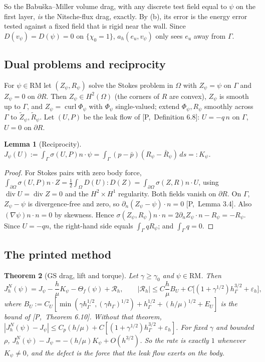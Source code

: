 \documentclass[11pt,reqno]{amsart}
\theoremstyle{plain}
\newtheorem{theorem}{Theorem}[section]
\newtheorem{lemma}[theorem]{Lemma}
\theoremstyle{definition}
\newcommand{\hG}{h_\Gamma}
\newcommand{\dn}{\partial_n}
\newcommand{\pbar}{\bar p}
\newcommand{\GS}{\mathrm{GS}}
\newcommand{\eps}{\varepsilon_h}
\newcommand{\curl}{\operatorname{curl}}
\renewcommand{\div}{\operatorname{div}}
\newcommand{\Pref}[1]{\textup{[P,~#1]}}
\newcommand{\RM}{\mathrm{RM}}
\begin{document}
So the Babu\v{s}ka--Miller volume drag, with any discrete test field equal to $\psi$ on the first layer, \emph{is} the Nitsche-flux drag, exactly. By (b), its error is the energy error tested against a fixed field that is rigid near the wall. Since $D(v_\psi)=D(\psi)=0$ on $\{\chi_0=1\}$, $a_h(e_u,v_\psi)$ only sees $e_u$ away from $\Gamma$.

\subsection{Dual problems and reciprocity}
For $\psi\in\RM$ let $(Z_\psi,R_\psi)$ solve the Stokes problem in $\Omega$ with $Z_\psi=\psi$ on $\Gamma$ and $Z_\psi=0$ on $\partial R$. Then $Z_\psi\in H^2(\Omega)$ (the corners of $R$ are convex), $Z_\psi$ is smooth up to $\Gamma$, and $Z_\psi=\curl\Phi_\psi$ with $\Phi_\psi$ single-valued; extend $\Phi_\psi,R_\psi$ smoothly across $\Gamma$ to $\tilde Z_\psi,\tilde R_\psi$. Let $(U,P)$ be the leak flow of \Pref{Definition 6.8}: $U=-q\,n$ on $\Gamma$, $U=0$ on $\partial R$.

\begin{lemma}[Reciprocity]\label{pd:lem:recip}
$J_\psi(U):=\int_\Gamma\sigma(U,P)n\cdot\psi=\int_\Gamma(p-\pbar)(R_\psi-\bar R_\psi)\,ds=:K_\psi$.
\end{lemma}

\begin{proof}
For Stokes pairs with zero body force, $\int_{\partial\Omega}\sigma(U,P)n\cdot Z=\frac12\int_\Omega D(U):D(Z)=\int_{\partial\Omega}\sigma(Z,R)n\cdot U$, using $\div U=\div Z=0$ and the $H^2\times H^1$ regularity. Both fields vanish on $\partial R$. On $\Gamma$, $Z_\psi-\psi$ is divergence-free and zero, so $\dn(Z_\psi-\psi)\cdot n=0$ \Pref{Lemma 3.4}. Also $(\nabla\psi)n\cdot n=0$ by skewness. Hence $\sigma(Z_\psi,R_\psi)n\cdot n=2\dn Z_\psi\cdot n-R_\psi=-R_\psi$. Since $U=-qn$, the right-hand side equals $\int_\Gamma qR_\psi$; and $\int_\Gamma q=0$.
\end{proof}

\subsection{The printed method}

\begin{theorem}[$\GS$ drag, lift and torque]\label{pd:thm:gsdrag}
Let $\gamma\ge\gamma_0$ and $\psi\in\RM$. Then
\[
J^N_h(\psi)=J_\psi-\frac h\mu K_\psi-\Theta_f(\psi)+\mathcal R_h,\qquad
|\mathcal R_h|\le C\frac h\mu B_U+C\bigl[(1+\gamma^{1/2})\hG^{3/2}+\eps\bigr],
\]
where $B_U:=C_U[\min(\gamma\hG^{1/2},(\gamma\hG)^{1/2})+\hG^{1/2}+(h/\mu)^{1/2}+E_U]$ is the bound of \Pref{Theorem 6.10}. Without that theorem, $|J^N_h(\psi)-J_\psi|\le C_p(h/\mu)+C[(1+\gamma^{1/2})\hG^{3/2}+\eps]$. For fixed $\gamma$ and bounded $\rho$, $J^N_h(\psi)-J_\psi=-(h/\mu)K_\psi+O(h^{3/2})$. So the rate is exactly $1$ whenever $K_\psi\ne0$, and the defect is the force that the leak flow exerts on the body.
\end{theorem}
\end{document}
